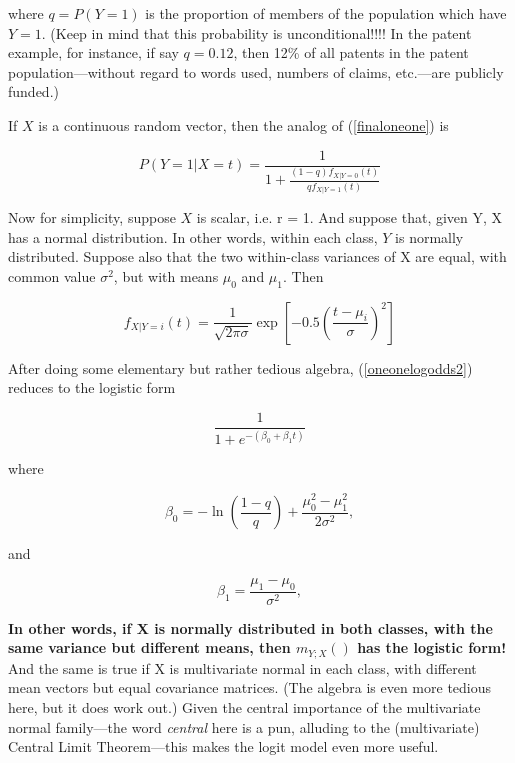 where $q = P(Y = 1)$ is the proportion of members of the population which
have $Y = 1$.  (Keep in mind that this probability is unconditional!!!!
In the patent example, for instance, if say $q = 0.12$, then 12\% of all
patents in the patent population---without regard to words used, numbers
of claims, etc.---are publicly funded.) 


If $X$ is a continuous random vector, then the analog of
(\ref{finaloneone}) is

\begin{equation}
\label{oneonelogodds2}
P(Y = 1 | X = t) = \frac{1}
{1 + \frac{(1-q) f_{X|Y=0}(t)}{q f_{X|Y=1}(t)}}
\end{equation}

Now for simplicity, suppose $X$ is scalar, i.e. r = 1.  And suppose
that, given Y, X has a normal distribution.  In other words, within each
class, $Y$ is normally distributed.  Suppose also that the two
within-class variances of X are equal, with common value $\sigma^2$, but
with means $\mu_0$ and $\mu_1$.  Then

\begin{equation}
f_{X|Y=i}(t) = \frac{1}{\sqrt{2\pi\sigma}}
\exp{\left [ -0.5 \left (\frac{t-\mu_i}{\sigma} \right )^2 \right ]}
\end{equation}

After doing some elementary but rather tedious algebra,
(\ref{oneonelogodds2}) reduces to the logistic form

\begin{equation}
\label{logitform}
\frac{1}{1+e^{-(\beta_0 + \beta_1 t)}}
\end{equation}

where 

\begin{equation}
\label{logitbeta0}
\beta_0 = -\ln{\left ( \frac{1-q}{q} \right )} + 
\frac{\mu^2_0 - \mu^2_1}{2\sigma^2},
\end{equation}

and

\begin{equation}
\label{logitbeta1}
\beta_1 = \frac{\mu_1 - \mu_0}{\sigma^2},
\end{equation} 

{\bf In other words, if X is normally distributed in both classes, with
the same variance but different means, then $m_{Y;X}()$ has the logistic
form!} And the same is true if X is multivariate normal in each class,
with different mean vectors but equal covariance matrices.  (The algebra
is even more tedious here, but it does work out.)  Given the central
importance of the multivariate normal family---the word {\it central}
here is a pun, alluding to the (multivariate) Central Limit
Theorem---this makes the logit model even more useful.

